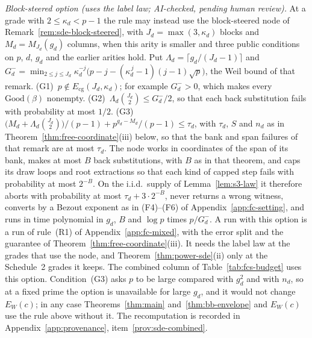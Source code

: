 \begin{remark}
\emph{Block-steered option (uses the label law; AI-checked, pending human review).} At a grade with $2 \le \kappa_d < p-1$ the rule may instead use the block-steered node of Remark~\ref{rem:sde-block-steered}, with $J_d = \max(3,\kappa_d)$ blocks and $M_d = M_{J_d}(g_d)$ columns, when this arity is smaller and three public conditions on $p$, $d$, $g_d$ and the earlier arities hold. Put $\Lambda_d = \lceil g_d/(J_d-1)\rceil$ and $G^-_d = \min_{2\le j\le J_d}\kappa_d^{-j}\bigl(p-j-(\kappa_d^{\,j}-1)(j-1)\sqrt p\bigr)$, the Weil bound of that remark. (G1)~$p \notin E_{\mathrm{cg}}(J_d,\kappa_d)$; for example $G^-_d > 0$, which makes every $\mathrm{Good}(\beta)$ nonempty. (G2)~$\Lambda_d\binom{J_d}{2} \le G^-_d/2$, so that each back substitution fails with probability at most $1/2$. (G3)~$\bigl(M_d + \Lambda_d\binom{J_d}{2}\bigr)/(p-1) + p^{g_d-M_d}/(p-1) \le \tau_d$, with $\tau_d$, $S$ and $n_d$ as in Theorem~\ref{thm:free-coordinate}(iii) below, so that the bank and span failures of that remark are at most $\tau_d$. The node works in coordinates of the span of its bank, makes at most $B$ back substitutions, with $B$ as in that theorem, and caps its draw loops and root extractions so that each kind of capped step fails with probability at most $2^{-B}$. On the i.i.d.\ supply of Lemma~\ref{lem:s3-law} it therefore aborts with probability at most $\tau_d + 3\cdot2^{-B}$, never returns a wrong witness, converts by a Bezout exponent as in (F4)--(F6) of Appendix~\ref{app:fc-setting}, and runs in time polynomial in $g_d$, $B$ and $\log p$ times $p/G^-_d$. A run with this option is a run of rule~(R1) of Appendix~\ref{app:fc-mixed}, with the error split and the guarantee of Theorem~\ref{thm:free-coordinate}(iii). It needs the label law at the grades that use the node, and Theorem~\ref{thm:power-sde}(ii) only at the Schedule~2 grades it keeps. The combined column of Table~\ref{tab:fcs-budget} uses this option. Condition~(G3) asks $p$ to be large compared with $g_d^2$ and with $n_d$, so at a fixed prime the option is unavailable for large $g_d$, and it would not change $E_W(c)$; in any case Theorems~\ref{thm:main} and~\ref{thm:bb-envelope} and $E_W(c)$ use the rule above without it. The recomputation is recorded in Appendix~\ref{app:provenance}, item~\ref{prov:sde-combined}.
\end{remark}


